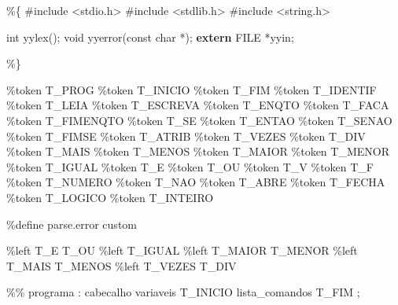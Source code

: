 \documentclass[
  brazilian,
  letterpaper,
]{book}
\newenvironment{Shaded}{\begin{snugshade}}{\end{snugshade}}
\newcommand{\DataTypeTok}[1]{\textcolor[rgb]{0.68,0.00,0.00}{#1}}
\newcommand{\ImportTok}[1]{\textcolor[rgb]{0.00,0.46,0.62}{#1}}
\newcommand{\KeywordTok}[1]{\textcolor[rgb]{0.00,0.23,0.31}{\textbf{#1}}}
\newcommand{\NormalTok}[1]{\textcolor[rgb]{0.00,0.23,0.31}{#1}}
\newcommand{\OperatorTok}[1]{\textcolor[rgb]{0.37,0.37,0.37}{#1}}
\newcommand{\PreprocessorTok}[1]{\textcolor[rgb]{0.68,0.00,0.00}{#1}}
\theoremstyle{plain}
\theoremstyle{definition}
\theoremstyle{remark}
\begin{document}
\begin{Shaded}
\begin{Highlighting}[]
\OperatorTok{\%\{}
\PreprocessorTok{\#include }\ImportTok{\textless{}stdio.h\textgreater{}}
\PreprocessorTok{\#include }\ImportTok{\textless{}stdlib.h\textgreater{}}
\PreprocessorTok{\#include }\ImportTok{\textless{}string.h\textgreater{}}

\DataTypeTok{int}\NormalTok{ yylex}\OperatorTok{();}
\DataTypeTok{void}\NormalTok{ yyerror}\OperatorTok{(}\DataTypeTok{const} \DataTypeTok{char} \OperatorTok{*);}
\KeywordTok{extern} \DataTypeTok{FILE} \OperatorTok{*}\NormalTok{yyin}\OperatorTok{;}

\OperatorTok{\%\}}

\OperatorTok{\%}\NormalTok{token T\_PROG}
\OperatorTok{\%}\NormalTok{token T\_INICIO}
\OperatorTok{\%}\NormalTok{token T\_FIM}
\OperatorTok{\%}\NormalTok{token T\_IDENTIF}
\OperatorTok{\%}\NormalTok{token T\_LEIA}
\OperatorTok{\%}\NormalTok{token T\_ESCREVA}
\OperatorTok{\%}\NormalTok{token T\_ENQTO}
\OperatorTok{\%}\NormalTok{token T\_FACA}
\OperatorTok{\%}\NormalTok{token T\_FIMENQTO}
\OperatorTok{\%}\NormalTok{token T\_SE }
\OperatorTok{\%}\NormalTok{token T\_ENTAO}
\OperatorTok{\%}\NormalTok{token T\_SENAO}
\OperatorTok{\%}\NormalTok{token T\_FIMSE}
\OperatorTok{\%}\NormalTok{token T\_ATRIB}
\OperatorTok{\%}\NormalTok{token T\_VEZES}
\OperatorTok{\%}\NormalTok{token T\_DIV}
\OperatorTok{\%}\NormalTok{token T\_MAIS}
\OperatorTok{\%}\NormalTok{token T\_MENOS}
\OperatorTok{\%}\NormalTok{token T\_MAIOR}
\OperatorTok{\%}\NormalTok{token T\_MENOR}
\OperatorTok{\%}\NormalTok{token T\_IGUAL}
\OperatorTok{\%}\NormalTok{token T\_E }
\OperatorTok{\%}\NormalTok{token T\_OU}
\OperatorTok{\%}\NormalTok{token T\_V }
\OperatorTok{\%}\NormalTok{token T\_F }
\OperatorTok{\%}\NormalTok{token T\_NUMERO}
\OperatorTok{\%}\NormalTok{token T\_NAO }
\OperatorTok{\%}\NormalTok{token T\_ABRE}
\OperatorTok{\%}\NormalTok{token T\_FECHA}
\OperatorTok{\%}\NormalTok{token T\_LOGICO}
\OperatorTok{\%}\NormalTok{token T\_INTEIRO}

\OperatorTok{\%}\NormalTok{define parse}\OperatorTok{.}\NormalTok{error custom}

\OperatorTok{\%}\NormalTok{left T\_E T\_OU}
\OperatorTok{\%}\NormalTok{left T\_IGUAL}
\OperatorTok{\%}\NormalTok{left T\_MAIOR T\_MENOR}
\OperatorTok{\%}\NormalTok{left T\_MAIS T\_MENOS}
\OperatorTok{\%}\NormalTok{left T\_VEZES T\_DIV}

\OperatorTok{\%\%}
\NormalTok{programa}
    \OperatorTok{:}\NormalTok{ cabecalho }
\NormalTok{      variaveis }
\NormalTok{      T\_INICIO lista\_comandos T\_FIM}
    \OperatorTok{;}


\end{Highlighting}
\end{Shaded}
\end{document}
